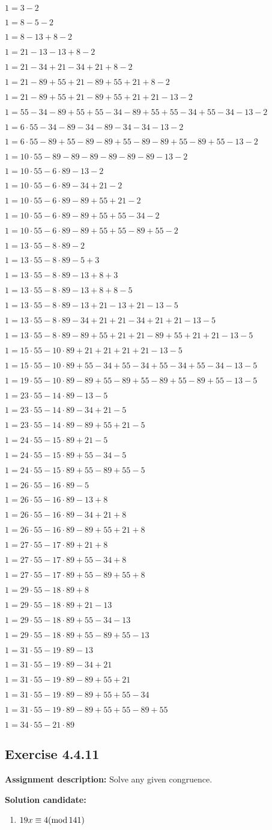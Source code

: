 \documentclass{report}
\newcommand{\cent}[1]{\begin{center}#1\end{center}}
\newcommand{\AssignmentDescription}{\textbf{Assignment description: }}
\newcommand{\Solution}{\textbf{Solution candidate: }}
\newcommand{\Exercise}[1]{\subsection{Exercise #1}}
\newcommand{\defaultEnumerateLabel}{\textbf{\alph*.}}
\newcommand{\modInline}{\text{mod\,}}
\newcommand{\MyItem}[1]{\item #1\\}
\begin{document}
\begin{enumerate}[label=\defaultEnumerateLabel]
\begin{enumerate}[label=\defaultEnumerateLabel]
		\cent{$1 = 3-2$}
		\cent{$1 = 8-5-2 $}
		\cent{$1 = 8-13+8-2 $}
		\cent{$1 = 21 -13-13+8-2 $}
		\cent{$1 = 21 -34+21-34+21+8-2$}
		\cent{$1 = 21 -89+55+21-89+55+21+8-2 $}
		\cent{$1 = 21 -89+55+21-89+55+21+21-13-2 $}
		\cent{$1 = 55-34 -89+55+55-34-89+55+55-34+55-34-13-2 $}
		\cent{$1 = 6 \cdot 55-34 -89-34-89-34-34-13-2 $}
		\cent{$1 = 6 \cdot 55-89+55 -89-89+55-89-89+55-89+55-13-2 $}
		\cent{$1 = 10 \cdot 55-89 -89-89-89-89-89-13-2 $}
		\cent{$1 = 10 \cdot 55-6 \cdot 89-13-2$}
		\cent{$1 = 10 \cdot 55-6 \cdot 89-34+21-2 $}
		\cent{$1 = 10 \cdot 55-6 \cdot 89-89+55+21-2 $}
		\cent{$1 = 10 \cdot 55-6 \cdot 89-89+55+55-34-2$}
		\cent{$1 = 10 \cdot 55-6 \cdot 89-89+55+55-89+55-2 $}
		\cent{$1 = 13 \cdot 55-8 \cdot 89-2$}
		\cent{$1 = 13 \cdot 55-8 \cdot 89-5+3 $}
		\cent{$1 = 13 \cdot 55-8 \cdot 89-13+8+3 $}
		\cent{$1 = 13 \cdot 55-8 \cdot 89-13+8+8-5 $}
		\cent{$1 = 13 \cdot 55-8 \cdot 89-13+21-13+21-13-5 $}
		\cent{$1 = 13 \cdot 55-8 \cdot 89-34+21+21-34+21+21-13-5 $}
		\cent{$1 = 13 \cdot 55-8 \cdot 89-89+55+21+21-89+55+21+21-13-5 $}
		\cent{$1 = 15 \cdot 55-10 \cdot 89+21+21+21+21-13-5 $}
		\cent{$1 = 15 \cdot 55-10 \cdot 89+55-34+55-34+55-34+55-34-13-5 $}
		\cent{$1 = 19 \cdot 55-10 \cdot 89-89+55-89+55-89+55-89+55-13-5 $}
		\cent{$1 = 23 \cdot 55-14 \cdot 89-13-5 $}
		\cent{$1 = 23 \cdot 55-14 \cdot 89-34+21-5 $}
		\cent{$1 = 23 \cdot 55-14 \cdot 89-89+55+21-5 $}
		\cent{$1 = 24 \cdot 55-15 \cdot 89+21-5 $}
		\cent{$1 = 24 \cdot 55-15 \cdot 89+55-34-5 $}
		\cent{$1 = 24 \cdot 55-15 \cdot 89+55-89+55-5 $}
		\cent{$1 = 26 \cdot 55-16 \cdot 89-5 $}
		\cent{$1 = 26 \cdot 55-16 \cdot 89-13+8 $}
		\cent{$1 = 26 \cdot 55-16 \cdot 89-34+21+8 $}
		\cent{$1 = 26 \cdot 55-16 \cdot 89-89+55+21+8 $}
		\cent{$1 = 27 \cdot 55-17 \cdot 89+21+8 $}
		\cent{$1 = 27 \cdot 55-17 \cdot 89+55-34+8 $}
		\cent{$1 = 27 \cdot 55-17 \cdot 89+55-89+55+8 $}
		\cent{$1 = 29 \cdot 55-18 \cdot 89+8 $}
		\cent{$1 = 29 \cdot 55-18 \cdot 89+21-13 $}
		\cent{$1 = 29 \cdot 55-18 \cdot 89+55-34-13 $}
		\cent{$1 = 29 \cdot 55-18 \cdot 89+55-89+55-13 $}
		\cent{$1 = 31 \cdot 55-19 \cdot 89-13 $}
		\cent{$1 = 31 \cdot 55-19 \cdot 89-34+21 $}
		\cent{$1 = 31 \cdot 55-19 \cdot 89-89+55+21 $}
		\cent{$1 = 31 \cdot 55-19 \cdot 89-89+55+55-34 $}
		\cent{$1 = 31 \cdot 55-19 \cdot 89-89+55+55-89+55 $}
		\cent{$1 = 34 \cdot 55-21 \cdot 89 $}
	\end{enumerate}

	\Exercise{4.4.11}
	
	\AssignmentDescription
	Solve any given congruence.
	
	\Solution
	\begin{enumerate}[label=\defaultEnumerateLabel]
		\MyItem{$19x \equiv 4 (\modInline 141)$}
		

\end{enumerate}
\end{enumerate}
\end{document}
